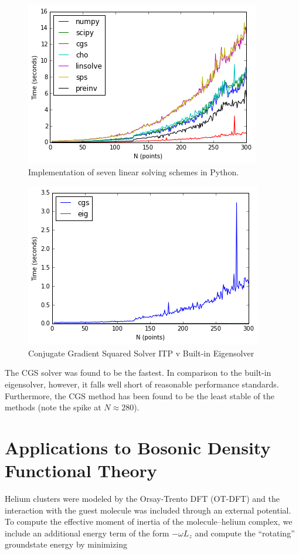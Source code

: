 \documentclass[12pt,]{book}
\begin{document}
\begin{figure}[htbp]
\centering
\includegraphics{assets/graphics/analysis_9_1.png}
\caption{Implementation of seven linear solving schemes in Python.}
\end{figure}

\begin{figure}[htbp]
\centering
\includegraphics{assets/graphics/analysis_10_1.png}
\caption{Conjugate Gradient Squared Solver ITP v Built-in Eigensolver}
\end{figure}

The CGS solver was found to be the fastest. In comparison to the
built-in eigensolver, however, it falls well short of reasonable
performance standards. Furthermore, the CGS method has been found to be
the least stable of the methods (note the spike at \(N\approx 280\)).

\pagebreak

\section*{Applications to Bosonic Density Functional Theory}

Helium clusters were modeled by the Orsay-Trento DFT (OT-DFT) and the
interaction with the guest molecule was included through an external
potential. To compute the effective moment of inertia of the
molecule--helium complex, we include an additional energy term of the
form \(-\omega L_z\) and compute the ``rotating'' groundstate energy by
minimizing
\end{document}
